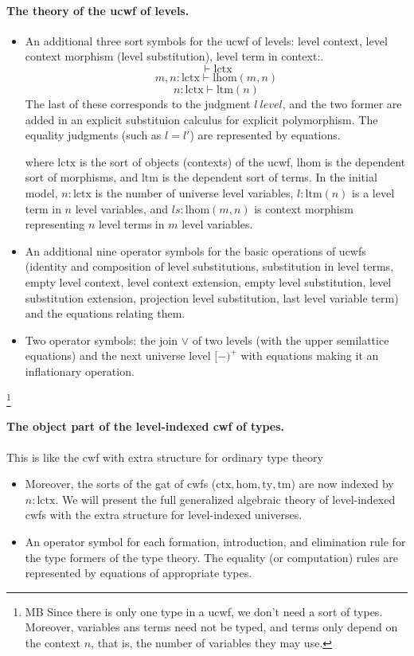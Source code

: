 \documentclass[11pt,a4paper]{article}
\theoremstyle{definition}
\newcommand{\Ctx}{\mathrm{Ctx}}
\newcommand{\Ty}{\mathrm{Ty}}
\newcommand{\Tm}{\mathrm{Tm}}
\def\lhom{\mathrm{lhom}}
\def\Ctx{\mathrm{ctx}}
\def\Ty{\mathrm{ty}}
\def\Tm{\mathrm{tm}}
\def\Hom{\mathrm{hom}}
\def\lctx{\mathrm{lctx}}
\def\ltm{\mathrm{ltm}}
\begin{document}
\paragraph{The theory of the ucwf of levels.}
\begin{itemize}
\item An additional three sort symbols for the ucwf of levels: level context, level context morphism (level substitution), level term in context:. 
$$
\vdash \lctx
$$
$$
m,n : \lctx \vdash \lhom(m,n)
$$
$$
n : \lctx \vdash  \ltm(n)
$$
The last of these corresponds to the judgment $l\ level$, and the two former are added in an explicit substituion calculus for explicit polymorphism. The equality judgments (such as $l = l'$) are represented by equations.

where $\lctx$ is the sort of objects (contexts) of the ucwf, $\lhom$ is the dependent sort of morphisms, and $\ltm$ is the dependent sort of terms.  In the initial model, $n : \lctx$ is the number of universe level variables, $l : \ltm(n)$ is a level term in $n$ level variables, and $ls : \lhom(m,n)$ is context morphism representing $n$ level terms in $m$ level variables.

\item An additional nine operator symbols for the basic operations of ucwfs (identity and composition of level substitutions, substitution in level terms, empty level context, level context extension, empty level substitution, level substitution extension, projection level substitution, last level variable term) and the equations relating them.
\item Two operator symbols: the join $\vee$ of two levels (with the upper semilattice equations) and the next universe level $[-)^+$ with equations making it an inflationary operation.
\end{itemize}
%
\footnote{MB Since there is only one type in a ucwf, we don't need
a sort of types. Moreover, variables ans terms need not be typed, and
terms only depend on the context $n$, that is, the number of variables
they may use.}

\paragraph{The object part of the level-indexed cwf of types.} This is like the cwf with extra structure for ordinary type theory
\begin{itemize}
\item
Moreover, the sorts of the gat of cwfs ($\Ctx,\Hom,\Ty,\Tm$) are now indexed by $n : \lctx$. We will present the full generalized algebraic theory of level-indexed cwfs with the extra structure for level-indexed universes.
\item An operator symbol for each formation, introduction, and elimination rule for the type formers of the type theory. The equality (or computation) rules are represented by equations of appropriate types.
\end{itemize}
\end{document}

